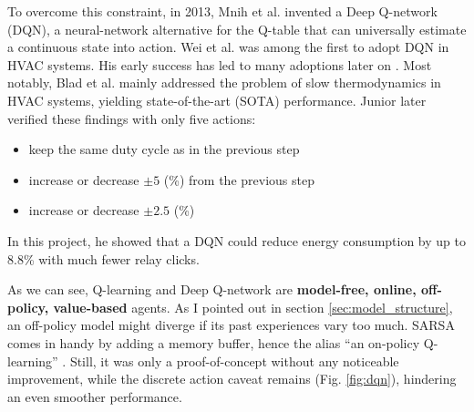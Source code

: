 \documentclass[../main.tex]{subfiles}
\begin{document}
To overcome this constraint, in 2013, Mnih et al. \cite{mnih2013playing} invented a Deep Q-network (DQN), a neural-network alternative for the Q-table that can universally estimate a continuous state into action. Wei et al. \cite{wei2017deep} was among the first to adopt DQN in HVAC systems. His early success has led to many adoptions later on \cite{barrett2015autonomous, jia2019advanced}. Most notably, Blad et al. \cite{blad2019control} mainly addressed the problem of slow thermodynamics in HVAC systems, yielding state-of-the-art (SOTA) performance. Junior \cite{junior22} later verified these findings with only five actions:
\begin{itemize}
    \item keep the same duty cycle as in the previous step
    \item increase or decrease $\pm 5$ (\%) from the previous step 
    \item increase or decrease $\pm 2.5$ (\%)
\end{itemize}
In this project, he showed that a DQN could reduce energy consumption by up to 8.8\% with much fewer relay clicks.

As we can see, Q-learning and Deep Q-network are \textbf{model-free, online, off-policy, value-based} agents. As I pointed out in section \ref{sec:model_structure}, an off-policy model might diverge if its past experiences vary too much. SARSA comes in handy by adding a memory buffer, hence the alias “an on-policy Q-learning” \cite{fu2018sarsa}. Still, it was only a proof-of-concept without any noticeable improvement, while the discrete action caveat remains (Fig. \ref{fig:dqn}), hindering an even smoother performance. 

\end{document}

